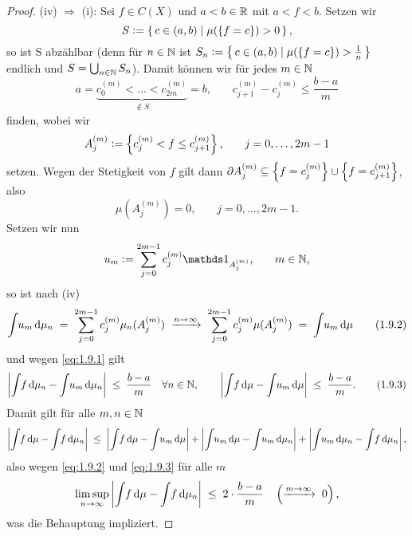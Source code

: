 \documentclass[../main/main.tex]{subfiles}
\begin{document}
\begin{proof}
		(iv) $\Rightarrow$ (i): Sei $f \in C(X)$ und $a < b \in \mathbb{R}$ mit $a < f < b$. Setzen wir
		$$S \vcentcolon = \left\{\, c \in (a, b) \; | \; \mu(\left\{f = c\right\}) > 0 \,\right\} \text{,}$$
		so ist S abzählbar (denn für $n \in \mathbb{N}$ ist $S_n \vcentcolon = \left\{\, c \in (a, b) \; | \; \mu(\left\{f = c\right\}) > \frac{1}{n} \,\right\}$ endlich und $S = \bigcup_{n \in \mathbb{N}} S_n$).
		Damit können wir für jedes $m \in \mathbb{N}$ 
		\[a = \underbrace{c_0^{(m)} < \dots < c_{2m}^{(m)}}_{\notin S} = b \text{,} \qquad c_{j+1}^{(m)} - c_j^{(m)} \leq \frac{b-a}{m} \label{eq:1.9.1} \tag{1.9.1}\]
		finden, wobei wir
		$$A_j^{(m)} \vcentcolon = \left\{c_j^{(m)} < f \leq c_{j+1}^{(m)}\right\}\text{,} \qquad j = 0,\dots,2m-1$$
		setzen. Wegen der Stetigkeit von $f$ gilt dann $\partial A_j^{(m)} \subseteq \left\{f = c_j^{(m)}\right\} \cup \left\{f = c_{j+1}^{(m)}\right\}$, also 
		$$\mu(A_j^{(m)}) = 0 \text{,} \qquad j = 0,\dots,2m-1 \text{.}$$
		Setzen wir nun
		$$u_m \defby \sum_{j=0}^{2m-1} c_j^{(m)} \indfct_{A_j^{(m)}} \text{,} \qquad m \in \N \text{,}$$
		so ist nach (iv)
		\[\int_{} \, u_m \, \mathrm{d}\mu_n \; = \; \sum_{j=0}^{2m-1} c_j^{(m)} \mu_n(A_j^{(m)}) \; \xrightarrow{n \to \infty} \; \sum_{j=0}^{2m-1} c_j^{(m)} \mu(A_j^{(m)}) \; = \; \int_{} \, u_m \, \mathrm{d}\mu \label{eq:1.9.2} \tag{1.9.2}\]
		und wegen \eqref{eq:1.9.1} gilt
		\[\left| \int_{} \, f \, \mathrm{d}\mu_n - \int_{} \, u_m \, \mathrm{d}\mu_n \right| \; \leq \; \frac{b-a}{m} \quad \forall n \in \mathbb{N} \text{,} \qquad \left| \int_{} \, f \, \mathrm{d}\mu - \int_{} \, u_m \, \mathrm{d}\mu \right| \; \leq \; \frac{b-a}{m} \text{.} \label{eq:1.9.3} \tag{1.9.3}\]
		Damit gilt für alle $m, n \in \mathbb{N}$
		$$ \left| \int_{} \, f \, \mathrm{d}\mu - \int_{} \, f \, \mathrm{d}\mu_n \right| \; \leq \; 
		\left| \int_{} \, f \, \mathrm{d}\mu - \int_{} \, u_m \, \mathrm{d}\mu \right| + \left| \int_{} \, u_m \, \mathrm{d}\mu - \int_{} \, u_m \, \mathrm{d}\mu_n \right| + \left| \int_{} \, u_m \, \mathrm{d}\mu_n - \int_{} \, f \, \mathrm{d}\mu_n \right| \text{,}$$
		also wegen \eqref{eq:1.9.2} und \eqref{eq:1.9.3} für alle $m$
		$$ \limsup_{n \to \infty} \left| \int_{} \, f \, \mathrm{d}\mu - \int_{} \, f \, \mathrm{d}\mu_n \right| \; \leq \; 2 \cdot \frac{b-a}{m} \quad \left(\xrightarrow{m \to \infty} \; 0\right) \text{,}$$
		was die Behauptung impliziert.
	\end{proof}

	
	
\end{document}
